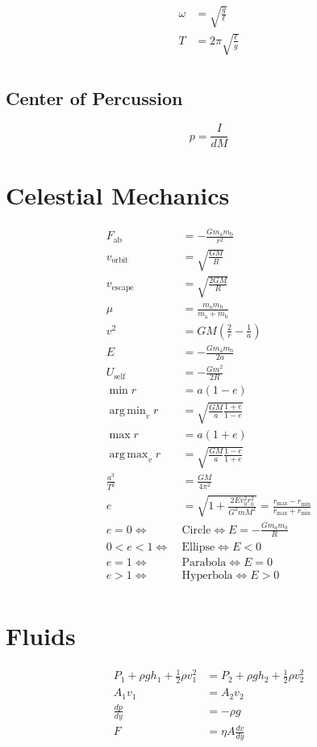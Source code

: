 \documentclass[12pt]{article}
\DeclareMathOperator*{\argmax}{arg\,max}
\DeclareMathOperator*{\argmin}{arg\,min}
\begin{document}
\begin{align*}
\omega &= \sqrt{\frac{g}{\ell}} \\
T &= 2 \pi \sqrt{\frac{\ell}{g}} \\
\end{align*}

\subsection{Center of Percussion}

$$p = \frac{I}{dM}$$

\section{Celestial Mechanics}

\begin{align*}
    F_{\text{ab}} &= - \frac{G m_{\text{a}} m_{\text{b}}}{r^2} \\
    v_{\text{orbit}} &= \sqrt{\frac{GM}{R}} \\
    v_{\text{escape}} &= \sqrt{\frac{2GM}{R}} \\
    \mu &= \frac{m_{\text{a}} m_{\text{b}}}{m_{\text{a}} + m_{\text{b}}} \\
    v^2 &= GM \left ( \frac{2}{r} - \frac{1}{a} \right) \\
    E &= - \frac{Gm_{\text{a}} m_{\text{b}}}{2a} \\
    U_{\text{self}} &= - \frac{Gm^2}{2R} \\
    \min{r} &= a \left (1 - e \right) \\
    \argmin_{v}{r} &= \sqrt{\frac{GM}{a} \frac{1+e}{1-e}} \\
    \max{r} &= a \left (1 + e \right) \\
    \argmax_{v}{r} &= \sqrt{\frac{GM}{a} \frac{1-e}{1+e}} \\
    \frac{a^3}{T^2} &= \frac{GM}{4 \pi^2} \\
    e &= \sqrt{1 + \frac{2E v_0^2 r_0^2}{G^2 m M^2}} = \frac{r_{\text{max}} - r_{\text{min}}}{r_{\text{max}} + r_{\text{min}}}\\
    e = 0  \Longleftrightarrow\ & \text{Circle} \Longleftrightarrow E = - \frac{Gm_a m_b}{R}\\
    0 < e < 1  \Longleftrightarrow\ & \text{Ellipse} \Longleftrightarrow E < 0 \\
    e = 1  \Longleftrightarrow\ & \text{Parabola} \Longleftrightarrow E = 0 \\
    e > 1  \Longleftrightarrow\ & \text{Hyperbola} \Longleftrightarrow E > 0 \\
\end{align*}

\section{Fluids}
\begin{align*}
    P_1 + \rho gh_1 + \frac{1}{2} \rho v_1^2 &= P_2 + \rho gh_2 + \frac{1}{2} \rho v_2^2  \\
    A_1 v_1 &= A_2 v_2 \\
    \frac{dp}{dy} &= - \rho g \\
    F &= \eta A \frac{dv}{dy} \\
\end{align*}
\end{document}
